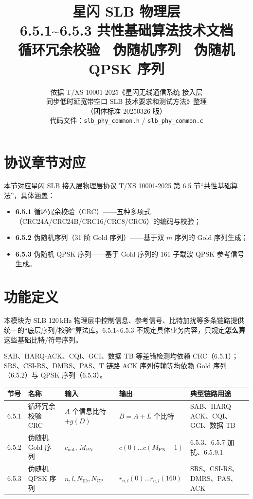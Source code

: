 \documentclass[11pt,a4paper]{ctexart}
\title{%
  \textbf{星闪 SLB 物理层}\\[0.4em]
  \Large 6.5.1\textasciitilde 6.5.3 共性基础算法技术文档\\[0.3em]
  \large 循环冗余校验 \textbullet\ 伪随机序列 \textbullet\ 伪随机 QPSK 序列
}
\author{依据 T/XS 10001-2025《星闪无线通信系统 接入层\\
同步低时延宽带空口 SLB 技术要求和测试方法》整理\\
（团体标准 20250326 版）\\[0.5em]
代码文件：\texttt{slb\_phy\_common.h} / \texttt{slb\_phy\_common.c}}
\date{}
\begin{document}
\maketitle
\tableofcontents
\newpage

\section{协议章节对应}

本节对应星闪 SLB 接入层物理层协议 T/XS 10001-2025 第 6.5 节``共性基础算法''，具体涵盖：
\begin{itemize}[nosep]
  \item \textbf{6.5.1} 循环冗余校验（CRC）——五种多项式（CRC24A/CRC24B/CRC16/CRC8/CRC6）的编码与校验；
  \item \textbf{6.5.2} 伪随机序列（31 阶 Gold 序列）——基于双 $m$ 序列的 Gold 序列生成；
  \item \textbf{6.5.3} 伪随机 QPSK 序列——基于 Gold 序列的 161 子载波 QPSK 参考信号生成。
\end{itemize}

\section{功能定义}

本模块为 SLB 120\,kHz 物理层中控制信息、参考信号、比特加扰等多条链路提供统一的``底层序列/校验''算法库。6.5.1\textasciitilde 6.5.3 不规定具体业务内容，只规定\textbf{怎么算}这些基础比特/符号序列。

SAB、HARQ-ACK、CQI、GCI、数据 TB 等差错检测均依赖 CRC（6.5.1）；SRS、CSI-RS、DMRS、PAS、T 链路 ACK 序列传输等均依赖 Gold 序列（6.5.2）与 QPSK 序列（6.5.3）。

\begin{table}[h]
\centering
\small
\begin{tabular}{lllll}
\toprule
\textbf{节号} & \textbf{名称} & \textbf{输入} & \textbf{输出} & \textbf{典型链路用途} \\
\midrule
6.5.1 & 循环冗余校验 CRC & $A$ 个信息比特 $+ g(D)$ & $B{=}A{+}L$ 个比特 & SAB、HARQ-ACK、CQI、GCI、数据 TB \\
6.5.2 & 伪随机 Gold 序列 & $c_{\mathrm{init}}$, $M_{\mathrm{PN}}$ & $c(0)\ldots c(M_{\mathrm{PN}}{-}1)$ & 6.5.3、6.5.7 加扰、6.5.9.1 \\
6.5.3 & 伪随机 QPSK 序列 & $n,l,N_{\mathrm{ID}},N_{\mathrm{CP}}$ & $r_{n,l}(0)\ldots r_{n,l}(160)$ & SRS、CSI-RS、DMRS、PAS、ACK \\
\bottomrule
\end{tabular}
\end{table}
\end{document}
